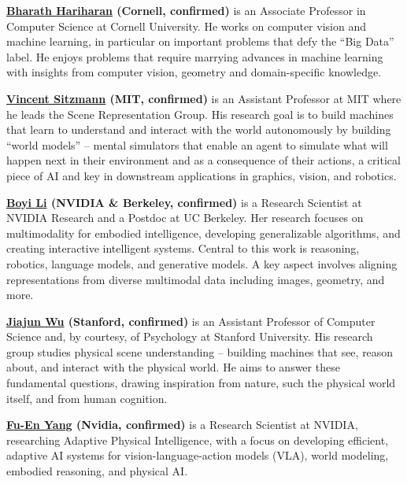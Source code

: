 \documentclass[runningheads]{llncs}
\begin{document}
\vspace{-0.5em}
\textbf{%
\href{https://www.cs.cornell.edu/~bharathh/}
{\textcolor{emailblue}{Bharath Hariharan}} (Cornell, confirmed)
}%
is an Associate Professor in Computer Science at Cornell University. He works on computer vision and machine learning, in particular on important problems that defy the ``Big Data'' label. He enjoys problems that require marrying advances in machine learning with insights from computer vision, geometry and domain-specific knowledge.

\vspace{-0.5em}
\textbf{%
\href{https://www.vincentsitzmann.com/}
{\textcolor{emailblue}{Vincent Sitzmann}} (MIT, confirmed)
}%
is an Assistant Professor at MIT where he leads the Scene Representation Group. His research goal is to build machines that learn to understand and interact with the world autonomously by building ``world models'' -- mental simulators that enable an agent to simulate what will happen next in their environment and as a consequence of their actions, a critical piece of AI and key in downstream applications in graphics, vision, and robotics.

\vspace{-0.5em}
\textbf{%
\href{https://sites.google.com/site/boyilics/}
{\textcolor{emailblue}{Boyi Li}} (NVIDIA \& Berkeley, confirmed)
}%
is a Research Scientist at NVIDIA Research and a Postdoc at UC Berkeley. Her research focuses on multimodality for embodied intelligence, developing generalizable algorithms, and creating interactive intelligent systems. Central to this work is reasoning, robotics, language models, and generative models. A key aspect involves aligning representations from diverse multimodal data including images, geometry, and more.

\vspace{-0.5em}
\textbf{%
\href{https://jiajunwu.com/}
{\textcolor{emailblue}{Jiajun Wu}} (Stanford, confirmed)
}%
is an Assistant Professor of Computer Science and, by courtesy, of Psychology at Stanford University.
His research group studies physical scene understanding -- building machines that see, reason about, and interact with the physical world.
He aims to answer these fundamental questions, drawing inspiration from nature, such the physical world itself, and from human cognition.

\vspace{-0.5em}
\textbf{%
\href{https://fuenyang1127.github.io/}
{\textcolor{emailblue}{Fu-En Yang}} (Nvidia, confirmed)
}%
is a Research Scientist at NVIDIA, researching Adaptive Physical Intelligence, with a focus on developing efficient, adaptive AI systems for vision-language-action models (VLA), world modeling, embodied reasoning, and physical AI.
\end{document}
